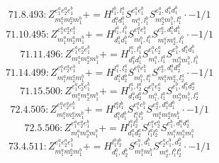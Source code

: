 \documentclass[letterpaper,10pt,fleqn,leqno,onecolumn]{article}
\begin{document}
\begin{equation} \;\;\;\;\;\;  71.8.493: Z^{e_{1}^{a}e_{2}^{a}e_{1}^{b}}_{m_{1}^{a}m_{2}^{a}m_{1}^{b}}+=H^{l_{1}^{b},l_{1}^{a}}_{d_{1}^{a}d_{1}^{b}}S^{e_{1}^{a}e_{1}^{b}}_{m_{1}^{a},l_{1}^{b}}S^{e_{2}^{a},d_{1}^{a}d_{1}^{b}}_{m_{2}^{a}m_{1}^{b},l_{1}^{a}}\cdot -1/1 \end{equation}
\begin{equation} \;\;\;\;\;\;  71.10.495: Z^{e_{1}^{a}e_{2}^{a}e_{1}^{b}}_{m_{1}^{a}m_{2}^{a}m_{1}^{b}}+=H^{l_{1}^{a},l_{1}^{b}}_{d_{1}^{a}d_{1}^{b}}S^{e_{1}^{a}e_{1}^{b}}_{m_{1}^{b},l_{1}^{a}}S^{e_{2}^{a},d_{1}^{a}d_{1}^{b}}_{m_{1}^{a}m_{2}^{a},l_{1}^{b}}\cdot -1/1 \end{equation}
\begin{equation} \;\;\;\;\;\;  71.11.496: Z^{e_{1}^{a}e_{2}^{a}e_{1}^{b}}_{m_{1}^{a}m_{2}^{a}m_{1}^{b}}+=H^{l_{1}^{a},l_{1}^{b}}_{d_{1}^{a}d_{1}^{b}}S^{e_{1}^{a}e_{2}^{a}}_{m_{1}^{a},l_{1}^{a}}S^{e_{1}^{b},d_{1}^{a}d_{1}^{b}}_{m_{2}^{a}m_{1}^{b},l_{1}^{b}} \end{equation}
\begin{equation} \;\;\;\;\;\;  71.14.499: Z^{e_{1}^{a}e_{2}^{a}e_{1}^{b}}_{m_{1}^{a}m_{2}^{a}m_{1}^{b}}+=H^{l_{1}^{a},l_{2}^{a}}_{d_{1}^{a}d_{2}^{a}}S^{e_{1}^{a}e_{1}^{b}}_{m_{1}^{b},l_{1}^{a}}S^{e_{2}^{a},d_{1}^{a}d_{2}^{a}}_{m_{1}^{a}m_{2}^{a},l_{2}^{a}}\cdot -1/1 \end{equation}
\begin{equation} \;\;\;\;\;\;  71.15.500: Z^{e_{1}^{a}e_{2}^{a}e_{1}^{b}}_{m_{1}^{a}m_{2}^{a}m_{1}^{b}}+=H^{l_{1}^{a},l_{2}^{a}}_{d_{1}^{a}d_{2}^{a}}S^{e_{1}^{a}e_{2}^{a}}_{m_{1}^{a},l_{1}^{a}}S^{e_{1}^{b},d_{1}^{a}d_{2}^{a}}_{m_{2}^{a}m_{1}^{b},l_{2}^{a}} \end{equation}
\begin{equation} \;\;\;\;\;\;  72.4.505: Z^{e_{1}^{a}e_{2}^{a}e_{1}^{b}}_{m_{1}^{a}m_{2}^{a}m_{1}^{b}}+=H^{l_{1}^{a}l_{1}^{b}}_{d_{1}^{a}d_{1}^{b}}S^{e_{1}^{a}e_{1}^{b}}_{l_{1}^{a}l_{1}^{b}}S^{e_{2}^{a},d_{1}^{a}d_{1}^{b}}_{m_{1}^{a}m_{2}^{a}m_{1}^{b}}\cdot -1/1 \end{equation}
\begin{equation} \;\;\;\;\;\;  72.5.506: Z^{e_{1}^{a}e_{2}^{a}e_{1}^{b}}_{m_{1}^{a}m_{2}^{a}m_{1}^{b}}+=H^{l_{1}^{a}l_{2}^{a}}_{d_{1}^{a}d_{2}^{a}}S^{e_{1}^{a}e_{2}^{a}}_{l_{1}^{a}l_{2}^{a}}S^{e_{1}^{b},d_{1}^{a}d_{2}^{a}}_{m_{1}^{a}m_{2}^{a}m_{1}^{b}} \end{equation}
\begin{equation} \;\;\;\;\;\;  73.4.511: Z^{e_{1}^{a}e_{2}^{a}e_{1}^{b}}_{m_{1}^{a}m_{2}^{a}m_{1}^{b}}+=H^{l_{1}^{b}l_{2}^{b}}_{d_{1}^{b},d_{2}^{b}}S^{e_{1}^{a},d_{1}^{b}}_{m_{1}^{a}m_{1}^{b}}S^{e_{2}^{a}e_{1}^{b},d_{2}^{b}}_{m_{2}^{a},l_{1}^{b}l_{2}^{b}}\cdot -1/1 \end{equation}
\end{document}
